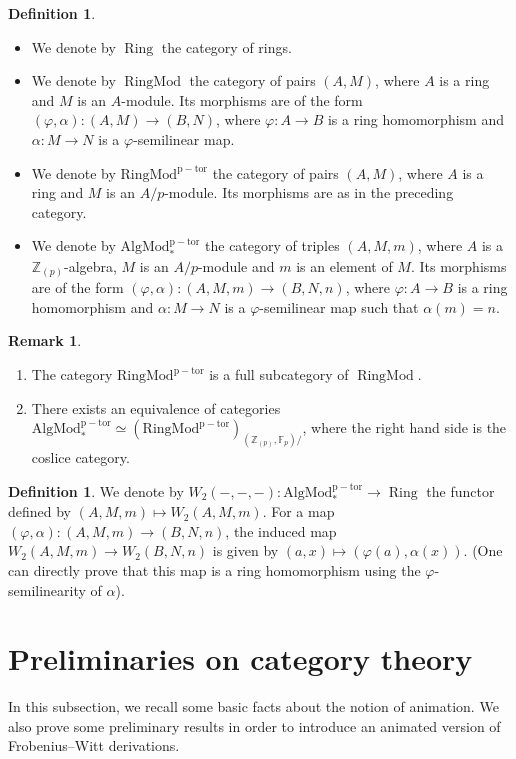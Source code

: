 \documentclass[11pt, a4paper]{amsart}
\theoremstyle{plain}
\theoremstyle{definition}
\newtheorem{definition}[theorem]{Definition}
\newtheorem{remark}[theorem]{Remark}
\begin{document}
\begin{definition}\label{def2.9}
\begin{itemize}
    \item We denote by $\operatorname{Ring}$ the category of rings.
    \item We denote by $\operatorname{RingMod}$ the category of pairs $(A,M)$, where $A$ is a ring and $M$ is an $A$-module. Its morphisms are of the form $(\varphi,\alpha):(A,M)\to (B,N)$, where $\varphi:A\to B$ is a ring homomorphism and $\alpha:M\to N$ is a $\varphi$-semilinear map. 
    \item We denote by $\operatorname{RingMod^{p-tor}}$ the category of pairs $(A,M)$, where $A$ is a ring and $M$ is an $A/p$-module. Its morphisms are as in the preceding category.
    \item We denote by $\operatorname{AlgMod^{p-tor}_*}$ the category of triples $(A,M,m)$, where $A$ is a $\mathbb Z_{(p)}$-algebra, $M$ is an $A/p$-module and $m$ is an element of $M$. Its morphisms are of the form $(\varphi,\alpha):(A,M,m)\to (B,N,n)$, where $\varphi:A\to B$ is a ring homomorphism and $\alpha:M\to N$ is a $\varphi$-semilinear map such that $\alpha(m)=n$.
\end{itemize}
\end{definition}
\begin{remark}\label{rem2.10}
    \begin{enumerate}
        \item The category $\operatorname{RingMod^{p-tor}}$ is a full subcategory of $\operatorname{RingMod}$. 
        \item There exists an equivalence of categories $\operatorname{AlgMod^{p-tor}_*}\simeq (\operatorname{RingMod^{p-tor}})_{(\mathbb Z_{(p)},\mathbb F_p)/}$, where the right hand side is the coslice category.
    \end{enumerate}
\end{remark}
\begin{definition}\label{def2.11}
    We denote by $W_2(-,-,-):\operatorname{AlgMod^{p-tor}_*}\to \operatorname{Ring}$ the functor defined by $(A,M,m)\mapsto W_2(A,M,m)$. For a map $(\varphi,\alpha):(A,M,m)\to (B,N,n)$, the induced map $W_2(A,M,m)\to W_2(B,N,n)$ is given by $(a,x)\mapsto (\varphi(a),\alpha(x))$. (One can directly prove that this map is a ring homomorphism using the $\varphi$-semilinearity of $\alpha$).
\end{definition}

\section{Preliminaries on category theory}
In this subsection, we recall some basic facts about the notion of animation. We also prove some preliminary results in order to introduce an animated version of Frobenius--Witt derivations.
\end{document}
